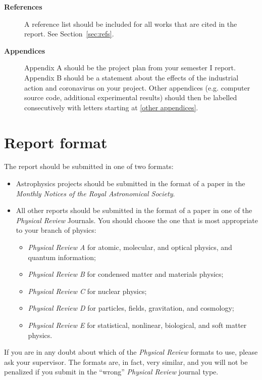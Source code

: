 \documentclass[a4paper,fleqn,usenatbib]{mnras}
\begin{document}
\begin{description}
\item[\textbf{References}]	A reference list should be included for all works that are cited in the report. See Section~\ref{sec:refs}.

\item[\textbf{Appendices}]	Appendix A should be the project plan from your semester I report. Appendix B should be a statement about the effects of the industrial action and coronavirus on your project. Other appendices (e.g. computer source code, additional experimental results) should then be labelled consecutively with letters starting at \ref{other appendices}. 
\end{description}

\section{Report format}
\label{sec:format}

The report should be submitted in one of two formats:
\begin{itemize}
\item Astrophysics projects should be submitted in the format of a paper in the \textit{Monthly Notices of the Royal Astronomical Society}.
\item All other reports should be submitted in the format of a paper in one of the \textit{Physical Review} Journals. You should choose the one that is most appropriate to your branch of physics:
\begin{itemize}
\item \textit{Physical Review A} for atomic, molecular, and optical physics, and quantum information;
\item \textit{Physical Review B} for condensed matter and materials physics;
\item \textit{Physical Review C} for nuclear physics;
\item \textit{Physical Review D} for particles, fields, gravitation, and cosmology;
\item \textit{Physical Review E} for statistical, nonlinear, biological, and soft matter physics.
\end{itemize}
\end{itemize}
If you are in any doubt about which of the \textit{Physical Review} formats to use, please ask your supervisor. The formats are, in fact, very similar, and you will not be penalized if you submit in the ``wrong''  \textit{Physical Review}  journal type.
\end{document}
